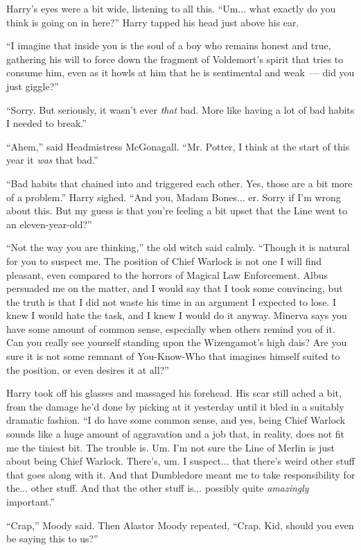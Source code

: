 Harry's eyes were a bit wide, listening to all this. ``Um... what exactly do you think is going on in here?'' Harry tapped his head just above his ear.

``I imagine that inside you is the soul of a boy who remains honest and true, gathering his will to force down the fragment of Voldemort's spirit that tries to consume him, even as it howls at him that he is sentimental and weak~--- did you just giggle?''

``Sorry. But seriously, it wasn't ever \emph{that} bad. More like having a lot of bad habits I needed to break.''

``Ahem,'' said Headmistress McGonagall. ``Mr. Potter, I think at the start of this year it \emph{was} that bad.''

``Bad habits that chained into and triggered each other. Yes, those are a bit more of a problem.'' Harry sighed. ``And you, Madam Bones... er. Sorry if I'm wrong about this. But my guess is that you're feeling a bit upset that the Line went to an eleven-year-old?''

``Not the way you are thinking,'' the old witch said calmly. ``Though it is natural for you to suspect me. The position of Chief Warlock is not one I will find pleasant, even compared to the horrors of Magical Law Enforcement. Albus persuaded me on the matter, and I would say that I took some convincing, but the truth is that I did not waste his time in an argument I expected to lose. I knew I would hate the task, and I knew I would do it anyway. Minerva says you have some amount of common sense, especially when others remind you of it. Can you really see yourself standing upon the Wizengamot's high dais? Are you sure it is not some remnant of You-Know-Who that imagines himself suited to the position, or even desires it at all?''

Harry took off his glasses and massaged his forehead. His scar still ached a bit, from the damage he'd done by picking at it yesterday until it bled in a suitably dramatic fashion. ``I do have some common sense, and yes, being Chief Warlock sounds like a huge amount of aggravation and a job that, in reality, does not fit me the tiniest bit. The trouble is. Um. I'm not sure the Line of Merlin is just about being Chief Warlock. There's, um. I suspect... that there's weird other stuff that goes along with it. And that Dumbledore meant me to take responsibility for the... other stuff. And that the other stuff is... possibly quite \emph{amazingly} important.''

``Crap,'' Moody said. Then Alastor Moody repeated, ``Crap. Kid, should you even be saying this to us?''


